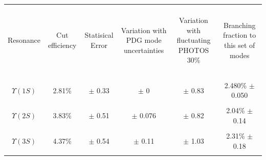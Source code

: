 \documentclass[landscape]{article}
\begin{document}
\begin{center}
  \begin{tabular}{c | c c c c | c}
    \hline\hline
    & & & & & \\
    \begin{minipage}{3 cm} \begin{center} Resonance \end{center} \end{minipage} &
    \begin{minipage}{2 cm} \begin{center} Cut efficiency \end{center} \end{minipage} &
    \begin{minipage}{2 cm} \begin{center} Statisical Error \end{center} \end{minipage} &
    \begin{minipage}{4 cm} \begin{center} Variation with PDG mode uncertainties \end{center} \end{minipage} &
    \begin{minipage}{4 cm} \begin{center} Variation with fluctuating PHOTOS 30\% \end{center} \end{minipage} &
    \begin{minipage}{3 cm} \begin{center} Branching fraction to this set of modes \end{center} \end{minipage} \\
    & & & & & \\\hline
    & & & & & \\
    $\Upsilon(1S)$ & 2.81\% & $\pm$ 0.33 & $\pm$ 0 & $\pm$ 0.83 & 2.480\% $\pm$ 0.050 \\
    & & & & & \\
    $\Upsilon(2S)$ & 3.83\% & $\pm$ 0.51 & $\pm$ 0.076 & $\pm$ 0.82 & 2.04\% $\pm$ 0.14 \\
    & & & & & \\
    $\Upsilon(3S)$ & 4.37\% & $\pm$ 0.54 & $\pm$ 0.11 & $\pm$ 1.03 & 2.31\% $\pm$ 0.18 \\
    & & & & & \\\hline\hline
  \end{tabular}
\end{center}
\end{document}
